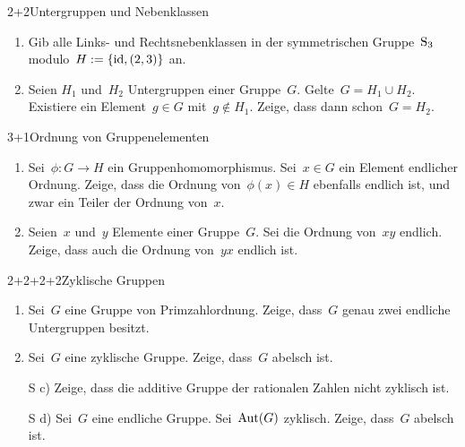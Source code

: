\documentclass{algblatt}
\begin{document}

\begin{aufgabe}{2+2}{Untergruppen und Nebenklassen}
\begin{enumerate}
\item
Gib alle Links- und Rechtsnebenklassen in der symmetrischen Gruppe~$\mathrm{S}_3$
modulo~$H := \{ \mathrm{id}, (2,3) \}$ an.
\item Seien $H_1$ und~$H_2$ Untergruppen einer Gruppe~$G$. Gelte~$G = H_1 \cup
H_2$. Existiere ein Element~$g \in G$ mit~$g \not\in H_1$. Zeige, dass dann schon~$G
= H_2$.
\end{enumerate}
\end{aufgabe}

\begin{aufgabe}{3+1}{Ordnung von Gruppenelementen}
\begin{enumerate}
\item Sei~$\phi : G \to H$ ein Gruppenhomomorphismus. Sei~$x \in G$ ein Element
endlicher Ordnung. Zeige, dass die Ordnung von~$\phi(x) \in H$ ebenfalls
endlich ist, und zwar ein Teiler der Ordnung von~$x$.
\item Seien~$x$ und~$y$ Elemente einer Gruppe~$G$. Sei die Ordnung von~$xy$
endlich. Zeige, dass auch die Ordnung von~$yx$ endlich ist.
\end{enumerate}
\end{aufgabe}

\begin{aufgabe}{2+2+2+2}{Zyklische Gruppen}
\begin{enumerate}
\item Sei~$G$ eine Gruppe von Primzahlordnung. Zeige, dass~$G$ genau
zwei endliche Untergruppen besitzt.
\item Sei~$G$ eine zyklische Gruppe. Zeige, dass~$G$ abelsch ist.
\item[S c)] Zeige, dass die additive Gruppe der rationalen Zahlen nicht zyklisch ist.
\item[S d)] Sei~$G$ eine endliche Gruppe. Sei~$\mathrm{Aut}(G)$ zyklisch.
Zeige, dass~$G$ abelsch ist.
\end{enumerate}
\end{aufgabe}
\end{document}
